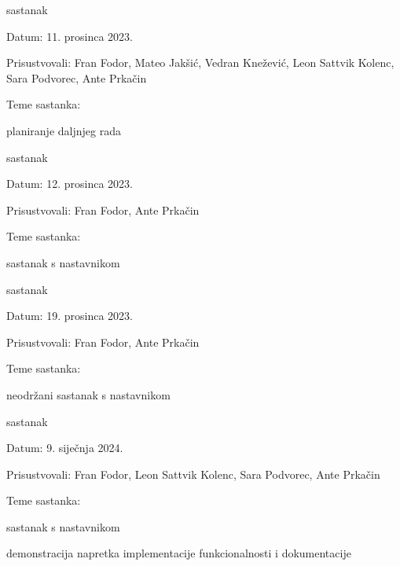 \begin{packed_enum}
			\item  sastanak
			\item[] \begin{packed_item}
				\item Datum: {11. prosinca 2023.}
				\item Prisustvovali: {Fran Fodor, Mateo Jakšić, Vedran Knežević, Leon Sattvik Kolenc, Sara Podvorec, Ante Prkačin}
				\item Teme sastanka:
				\begin{packed_item}
					\item  planiranje daljnjeg rada
				\end{packed_item}
			\end{packed_item}

			\item  sastanak
			\item[] \begin{packed_item}
				\item Datum: {12. prosinca 2023.}
				\item Prisustvovali: {Fran Fodor, Ante Prkačin}
				\item Teme sastanka:
				\begin{packed_item}
					\item  sastanak s nastavnikom
				\end{packed_item}
			\end{packed_item}

			\item  sastanak
			\item[] \begin{packed_item}
				\item Datum: {19. prosinca 2023.}
				\item Prisustvovali: {Fran Fodor, Ante Prkačin}
				\item Teme sastanka:
				\begin{packed_item}
					\item  neodržani sastanak s nastavnikom
				\end{packed_item}
			\end{packed_item}

			\item  sastanak
			\item[] \begin{packed_item}
				\item Datum: {9. siječnja 2024.}
				\item Prisustvovali: {Fran Fodor, Leon Sattvik Kolenc, Sara Podvorec, Ante Prkačin}
				\item Teme sastanka:
				\begin{packed_item}
					\item  sastanak s nastavnikom
					\item  demonstracija napretka implementacije funkcionalnosti i dokumentacije
				\end{packed_item}
			\end{packed_item}


\end{packed_enum}
